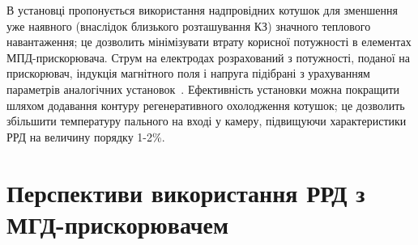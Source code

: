 В установці пропонується використання надпровідних котушок для зменшення уже наявного (внаслідок близького розташування КЗ) значного теплового навантаження; це дозволить мінімізувати втрату корисної потужності в елементах МПД-прискорювача. Струм на електродах розрахований з потужності, поданої на прискорювач, індукція магнітного поля і напруга підібрані з урахуванням параметрів аналогічних установок~\cite{MHDG}. Ефективність установки можна покращити шляхом додавання контуру регенеративного охолодження котушок; це дозволить збільшити температуру пального на вході у камеру, підвищуючи характеристики РРД на величину порядку 1-2\%.




\section{Перспективи використання РРД з МГД-прискорювачем}

